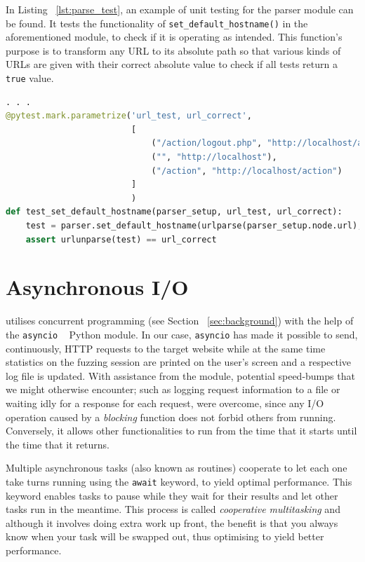 In Listing ~\ref{lst:parse_test}, an example of unit testing for the parser module can be found. It tests the functionality of {\tt set\_default\_hostname()} in the aforementioned module, to check if it is operating as intended. This function's purpose is to transform any URL to its absolute path so that various kinds of URLs are given with their correct absolute value to check if all tests return a {\tt true} value.

\begin{lstlisting}[aboveskip=\baselineskip, showstringspaces=false, frame=single, language=Python, columns=flexible, keepspaces=true, caption={\textit{Unit test for method set\_default\_hostname()}}, numberstyle=\color{gray}, numbersep=5pt, label={lst:parse_test}]
. . . 
@pytest.mark.parametrize('url_test, url_correct',
                         [
                             ("/action/logout.php", "http://localhost/action/logout.php"),
                             ("", "http://localhost"),
                             ("/action", "http://localhost/action")
                         ]
                         )
def test_set_default_hostname(parser_setup, url_test, url_correct):
    test = parser.set_default_hostname(urlparse(parser_setup.node.url), urlparse(url_test))
    assert urlunparse(test) == url_correct
\end{lstlisting}

\section{Asynchronous I/O}
\pname{} utilises concurrent programming (see Section ~\ref{sec:background}) with the help of the {\tt asyncio} ~\cite{asyncio} Python module. In our case, {\tt asyncio} has made it possible to send, continuously, HTTP requests to the target website while at the same time statistics on the fuzzing session are printed on the user's screen and a respective log file is updated. With assistance from the module, potential speed-bumps that we might otherwise encounter; such as logging request information to a file or waiting idly for a response for each request, were overcome, since any I/O operation caused by a \emph{blocking} function does not forbid others from running. Conversely, it allows other functionalities to run from the time that it starts until the time that it returns. 

Multiple asynchronous tasks (also known as routines) cooperate to let each one take turns running using the {\tt await} keyword, to yield optimal performance. This keyword enables tasks to pause while they wait for their results and let other tasks run in the meantime. This process is called \emph{cooperative multitasking} and although it involves doing extra work up front, the benefit is that you always know when your task will be swapped out, thus optimising to yield better performance.

